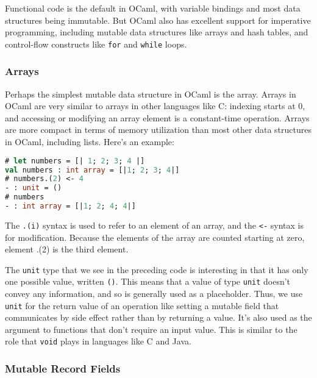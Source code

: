 Functional code is the default in OCaml, with variable bindings and most
data structures being immutable. But OCaml also has excellent support
for imperative programming, including mutable data structures like
arrays and hash tables, and control-flow constructs like
\passthrough{\lstinline!for!} and \passthrough{\lstinline!while!} loops.

\hypertarget{arrays}{%
\subsubsection{Arrays}\label{arrays}}

Perhaps the simplest mutable data structure in OCaml is the array.
Arrays in OCaml are very similar to arrays in other languages like C:
indexing starts at 0, and accessing or modifying an array element is a
constant-time operation. Arrays are more compact in terms of memory
utilization than most other data structures in OCaml, including lists.
Here's an example:

\begin{lstlisting}[language=Caml]
# let numbers = [| 1; 2; 3; 4 |]
val numbers : int array = [|1; 2; 3; 4|]
# numbers.(2) <- 4
- : unit = ()
# numbers
- : int array = [|1; 2; 4; 4|]
\end{lstlisting}

The \passthrough{\lstinline!.(i)!} syntax is used to refer to an element
of an array, and the \passthrough{\lstinline!<-!} syntax is for
modification. Because the elements of the array are counted starting at
zero, element {.(2) is} the third element.

The \passthrough{\lstinline!unit!} type that we see in the preceding
code is interesting in that it has only one possible value, written
\passthrough{\lstinline!()!}. This means that a value of type
\passthrough{\lstinline!unit!} doesn't convey any information, and so is
generally used as a placeholder. Thus, we use
\passthrough{\lstinline!unit!} for the return value of an operation like
setting a mutable field that communicates by side effect rather than by
returning a value. It's also used as the argument to functions that
don't require an input value. This is similar to the role that
\passthrough{\lstinline!void!} plays in languages like C and Java.

\hypertarget{mutable-record-fields}{%
\subsubsection{Mutable Record Fields}\label{mutable-record-fields}}

